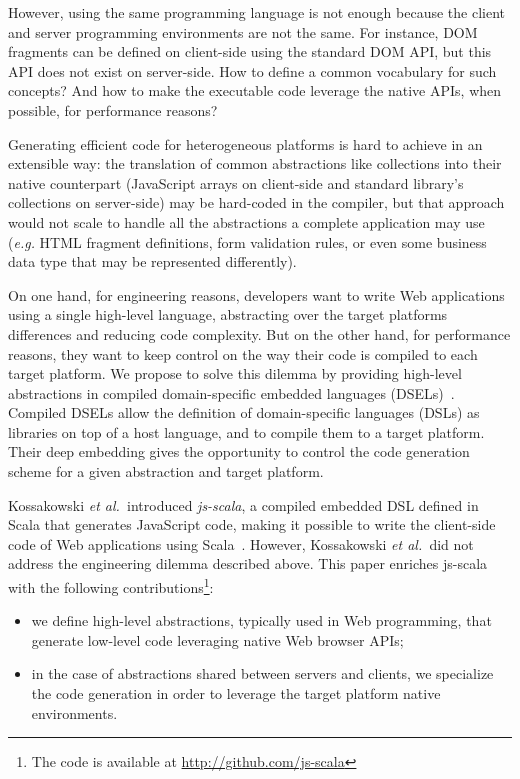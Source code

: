 \documentclass[preprint]{sigplanconf}
\newcommand{\eg}{\emph{e.g.}}
\newcommand{\etal}{\emph{et al.~}}
\begin{document}
However, using the same programming language is not enough because the client and server programming
environments are not the same. For instance, DOM fragments can be defined on client-side using the
standard DOM API, but this API does not exist on server-side. How to define a common vocabulary for
such concepts? And how to make the executable code leverage the native APIs, when possible, for
performance reasons?

Generating efficient code for heterogeneous platforms is hard to achieve in an extensible way: the
translation of common abstractions like collections into their native counterpart (JavaScript arrays
on client-side and standard library's collections on server-side) may be hard-coded in the compiler,
but that approach would not scale to handle all the abstractions a complete application may use
(\eg{} HTML fragment definitions, form validation rules, or even some business data type that may be
represented differently).

On one hand, for engineering reasons, developers want to write Web applications using a single
high-level language, abstracting over the target platforms differences and reducing code complexity.
But on the other hand, for performance reasons, they want to keep control on the way their code is
compiled to each target platform. We propose to solve this dilemma by providing high-level
abstractions in compiled domain-specific embedded languages (DSELs)~\cite{Hudak96_DSEL,
Elliott2003_Compiling}. Compiled DSELs allow the definition of domain-specific languages (DSLs) as
libraries on top of a host language, and to compile them to a target platform. Their deep embedding
gives the opportunity to control the code generation scheme for a given abstraction and target
platform.

Kossakowski \etal introduced \emph{js-scala}, a compiled embedded DSL defined in Scala that
generates JavaScript code, making it possible to write the client-side code of Web applications
using Scala~\cite{Kossakowski12_JsDESL}. However, Kossakowski \etal did not address the
engineering dilemma described above. This paper enriches js-scala with the following
contributions\footnote{The code is available at
\href{http://github.com/js-scala}{http://github.com/js-scala}}:

\begin{itemize}
 \item we define high-level abstractions, typically used in Web programming, that generate low-level
code leveraging native Web browser APIs;
 \item in the case of abstractions shared between servers and clients, we specialize the code
generation in order to leverage the target platform native environments.
\end{itemize}
\end{document}
